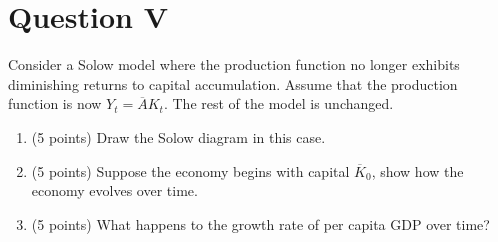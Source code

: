 \documentclass[letterpaper,12pt]{article}
\theoremstyle{dotlessS}
\begin{document}
\section*{Question V}
Consider a Solow model where the production function no longer exhibits diminishing returns to capital accumulation. Assume that the production function is now $Y_t=\overline{A}K_t$. The rest of the model is unchanged.
\begin{enumerate}[label=\alph*]
\item (5 points) Draw the Solow diagram in this case.
\item (5 points) Suppose the economy begins with capital $\overline{K}_0$, show how the economy evolves over time.
\item (5 points) What happens to the growth rate of per capita GDP over time?
\end{enumerate}
\end{document}

